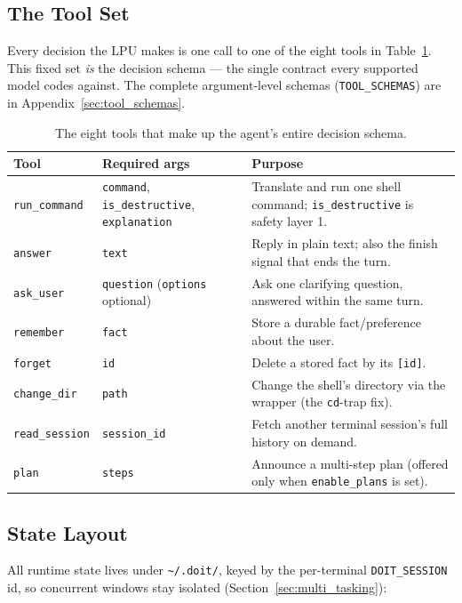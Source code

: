 \documentclass[11pt,a4paper]{article}
\begin{document}
\subsection{The Tool Set}
\label{sec:tool_set}
Every decision the LPU makes is one call to one of the eight tools in Table~\ref{tab:tools_overview}. This fixed set \emph{is} the decision schema --- the single contract every supported model codes against. The complete argument-level schemas (\texttt{TOOL\_SCHEMAS}) are in Appendix~\ref{sec:tool_schemas}.

\begin{table}[H]
    \centering
    \caption{The eight tools that make up the agent's entire decision schema.}
    \begin{tabularx}{\textwidth}{llX}
        \toprule
        \textbf{Tool} & \textbf{Required args} & \textbf{Purpose} \\
        \midrule
        \texttt{run\_command} & \texttt{command}, \texttt{is\_destructive}, \texttt{explanation} & Translate and run one shell command; \texttt{is\_destructive} is safety layer 1. \\
        \texttt{answer} & \texttt{text} & Reply in plain text; also the finish signal that ends the turn. \\
        \texttt{ask\_user} & \texttt{question} (\texttt{options} optional) & Ask one clarifying question, answered within the same turn. \\
        \texttt{remember} & \texttt{fact} & Store a durable fact/preference about the user. \\
        \texttt{forget} & \texttt{id} & Delete a stored fact by its \texttt{[id]}. \\
        \texttt{change\_dir} & \texttt{path} & Change the shell's directory via the wrapper (the \texttt{cd}-trap fix). \\
        \texttt{read\_session} & \texttt{session\_id} & Fetch another terminal session's full history on demand. \\
        \texttt{plan} & \texttt{steps} & Announce a multi-step plan (offered only when \texttt{enable\_plans} is set). \\
        \bottomrule
    \end{tabularx}
    \label{tab:tools_overview}
\end{table}

\subsection{State Layout}
\label{sec:layout}
All runtime state lives under \texttt{\textasciitilde/.doit/}, keyed by the per-terminal \texttt{DOIT\_SESSION} id, so concurrent windows stay isolated (Section~\ref{sec:multi_tasking}):
\end{document}

